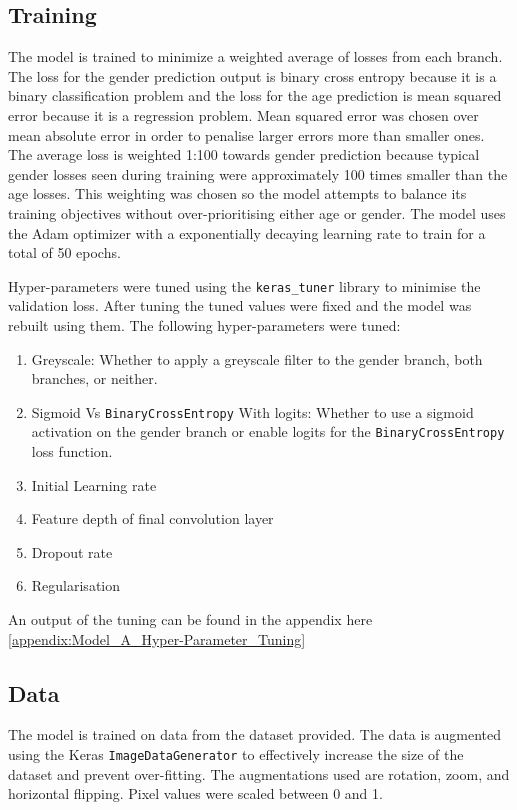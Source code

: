 \subsection{Training}
The model is trained to minimize a weighted average of losses from each branch. \\
The loss for the gender prediction output is binary cross entropy because it is a binary classification problem and the loss for the age prediction is mean squared error because it is a regression problem. 
Mean squared error was chosen over mean absolute error in order to penalise larger errors more than smaller ones. 
The average loss is weighted 1:100 towards gender prediction because typical gender losses seen during training were approximately 100 times smaller than the age losses.
This weighting was chosen so the model attempts to balance its training objectives without over-prioritising either age or gender. 
The model uses the Adam optimizer with a exponentially decaying learning rate to train for a total of 50 epochs. 

Hyper-parameters were tuned using the \verb|keras_tuner| library to minimise the validation loss. After tuning the tuned values were fixed and the model was rebuilt using them. The following hyper-parameters were tuned:
\begin{enumerate}
    \item Greyscale: Whether to apply a greyscale filter to the gender branch, both branches, or neither.
    \item Sigmoid Vs \verb|BinaryCrossEntropy| With logits: Whether to use a sigmoid activation on the gender branch or enable logits for the \verb|BinaryCrossEntropy| loss function.
    \item Initial Learning rate
    \item Feature depth of final convolution layer
    \item Dropout rate 
    \item Regularisation
\end{enumerate}
An output of the tuning can be found in the appendix here \autoref{appendix:Model_A_Hyper-Parameter_Tuning}

\subsection{Data}
The model is trained on data from the dataset provided. The data is augmented using the Keras \verb|ImageDataGenerator| to effectively increase the size of the dataset and prevent over-fitting. 
The augmentations used are rotation, zoom, and horizontal flipping. Pixel values were scaled between 0 and 1.


